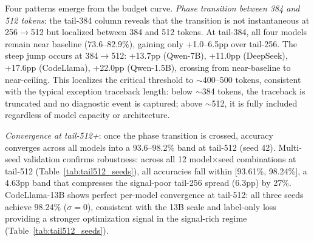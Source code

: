 Four patterns emerge from the budget curve.
\emph{Phase transition between 384 and 512 tokens}: the tail-384 column reveals that the transition is not instantaneous at 256$\to$512 but localized between 384 and 512 tokens.
At tail-384, all four models remain near baseline (73.6--82.9\%), gaining only +1.0--6.5pp over tail-256.
The steep jump occurs at 384$\to$512: +13.7pp (Qwen-7B), +11.0pp (DeepSeek), +17.6pp (CodeLlama), +22.0pp (Qwen-1.5B), crossing from near-baseline to near-ceiling.
This localizes the critical threshold to ${\sim}$400--500 tokens, consistent with the typical exception traceback length: below ${\sim}$384 tokens, the traceback is truncated and no diagnostic event is captured; above ${\sim}$512, it is fully included regardless of model capacity or architecture.

\emph{Convergence at tail-512+}: once the phase transition is crossed, accuracy converges across all models into a 93.6--98.2\% band at tail-512 (seed 42).
Multi-seed validation confirms robustness: across all 12 model$\times$seed combinations at tail-512 (Table~\ref{tab:tail512_seeds}), all accuracies fall within [93.61\%, 98.24\%], a 4.63pp band that compresses the signal-poor tail-256 spread (6.3pp) by 27\%.
CodeLlama-13B shows perfect per-model convergence at tail-512: all three seeds achieve 98.24\% ($\sigma{=}$0), consistent with the 13B scale and label-only loss providing a stronger optimization signal in the signal-rich regime (Table~\ref{tab:tail512_seeds}).

\begin{table}[h!]
\centering
\caption{Cross-seed convergence at the tail-512 truncation point ($N{=}1{,}190$ per seed). All 12 model$\times$seed combinations fall within a 4.63pp band [93.61\%, 98.24\%]. CodeLlama-13B achieves identical accuracy across all three seeds ($\sigma{=}$0).}
\label{tab:tail512_seeds}
\small
{}
\end{table}


